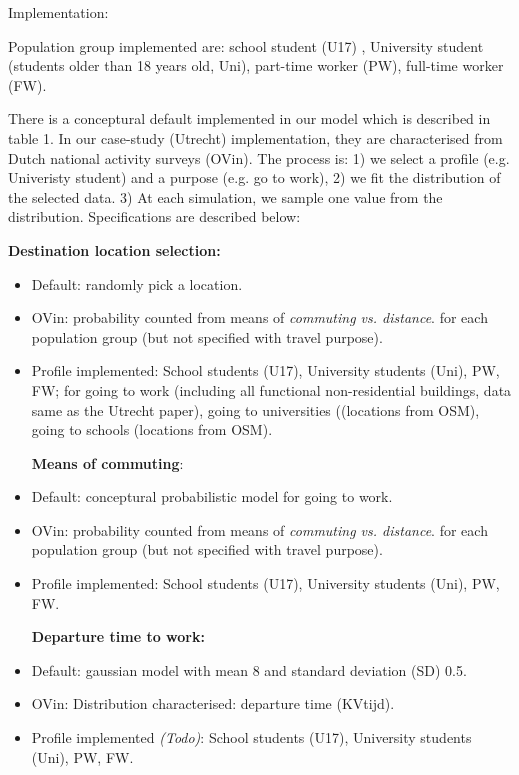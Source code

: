 \documentclass[]{article}
\begin{document}
\begin{enumerate}
  Implementation:

  Population group implemented are: school student (U17) , University
  student (students older than 18 years old, Uni), part-time worker
  (PW), full-time worker (FW).

  There is a conceptural default implemented in our model which is
  described in table 1. In our case-study (Utrecht) implementation, they
  are characterised from Dutch national activity surveys (OVin). The
  process is: 1) we select a profile (e.g. Univeristy student) and a
  purpose (e.g. go to work), 2) we fit the distribution of the selected
  data. 3) At each simulation, we sample one value from the
  distribution. Specifications are described below:

  \textbf{Destination location selection:}
\end{enumerate}


\begin{itemize}
\item
  Default: randomly pick a location.
\item
  OVin: probability counted from means of \emph{commuting vs. distance}.
  for each population group (but not specified with travel purpose).
\item
  Profile implemented: School students (U17), University students (Uni),
  PW, FW; for going to work (including all functional non-residential
  buildings, data same as the Utrecht paper), going to universities
  ((locations from OSM), going to schools (locations from OSM).

  \textbf{Means of commuting}:
\item
  Default: conceptural probabilistic model for going to work.
\item
  OVin: probability counted from means of \emph{commuting vs. distance}.
  for each population group (but not specified with travel purpose).
\item
  Profile implemented: School students (U17), University students (Uni),
  PW, FW.

  \textbf{Departure time to work:} 
\item
  Default: gaussian model with mean 8 and standard deviation (SD) 0.5.
\item
  OVin: Distribution characterised: departure time (KVtijd). 
\item
  Profile implemented \emph{(Todo)}: School students (U17), University
  students (Uni), PW, FW. 
\end{itemize}
\end{document}
